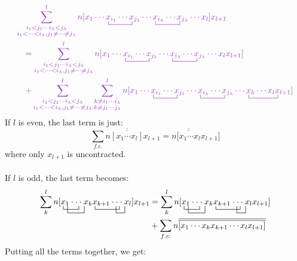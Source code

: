 \documentclass{article}
\newcommand{\ol}{\overline}
\newcommand{\ctr}{\bcontraction}
\newcommand{\cd}{\ensuremath{\cdots} }
\def\cp#1{{\color{purple}#1}}
\begin{document}
\begin{align*}
& \cp{ \sum_{\substack{i_1 <  j_1 \cd  i_{\lambda} < j_{\lambda} \\ i_1 < \cd < i_{\lambda}, j_1 \neq \cd \neq j_{\lambda}}}^l
n[x_1 \cd \ctr{}{x}{{}_{i_1}\cd}{x} x_{i_1}  \cd x_{j_1} \cd \ctr{}{x}{{}_{i_{\lambda } }\cd}{x} x_{i_{\lambda}}  \cd x_{j_{\lambda}} \cd x_l ] x_{l + 1} }  \\
& \quad \cp{ =  \sum_{\substack{i_1 <  j_1 \cd  i_{\lambda } < j_{\lambda } \\ i_1 < \cd < i_{\lambda }, j_1 \neq \cd \neq j_{\lambda}}}^l
n[x_1 \cd \ctr{}{x}{{}_{i_1}\cd}{x} x_{i_1}  \cd x_{j_1} \cd \ctr{}{x}{{}_{i_{\lambda} }\cd}{x} x_{i_{\lambda}}  \cd x_{j_{\lambda }} \cd x_l x_{l + 1} ]  } \\
& \quad \cp{ + \sum_{\substack{i_1 <  j_1 \cd  i_{\lambda } < j_{\lambda } \\ i_1 < \cd < i_{\lambda }, j_1 \neq \cd \neq j_{\lambda}}}^l
\sum_{\substack{k\neq i_1 \cd i_{\lambda} \\ k\neq j_1\cd j_{\lambda }} }^{l}
n[x_1 \cd \ctr{}{x}{{}_{i_1}\cd}{x} x_{i_1}  \cd x_{j_1} \cd \ctr{}{x}{{}_{i_{\lambda } }\cd}{x} x_{i_{\lambda}}  \cd x_{j_{\lambda }} \cd \ctr{}{x}{{}_k \cd  x_l}{x}  x_k \cd x_l x_{l + 1} ]  } \\
\end{align*}
If $l$ is even, the last term is just:
\[ \sum_{f.c.} n\ol{\ol{[x_1\cd x_l]}}x_{l+1} = n\ol{\ol{[x_1\cd x_l}} x_{l+1}]  \]
where only $x_{l+1}$ is uncontracted. \\ \\ 
If $l$ is odd, the last term becomes:
\begin{align*}
\sum_{k}^l n[  
\ctr{}{x}{{}_1 \cdot}{\cdot}
\ctr[2ex]{x}{{}_1 }{\cdot \cdot\cdot}{}
x_1 \cdot \cdot \cdot  x_k 
\ctr{}{x}{{}_{k+1} \cdot}{\cdot}{ {}}
\ctr[2ex]{x_{k + 1}  \cdot}{}{\cdot}{x}
x_{k + 1}  \cdot \cdot \cdot  x_l] x_{l+1} &= 
\sum_{k}^l n[  
\ctr{}{x}{{}_1 \cdot}{\cdot}
\ctr[2ex]{x}{{}_1 }{\cdot \cdot\cdot}{}
x_1 \cdot \cdot \cdot  x_k 
\ctr{}{x}{{}_{k+1} \cdot}{\cdot}{ {}}
\ctr[2ex]{x_{k + 1}  \cdot}{}{\cdot}{x}
x_{k + 1}  \cdot \cdot \cdot  x_l x_{l+1}] \\
&+ \sum_{f.c.} n\ol{\ol{[  x_1  \cd  x_k x_{k + 1} \cd  x_l x_{l+1} ] }} \\
\end{align*}
Putting all the terms together, we get:
\end{document}
